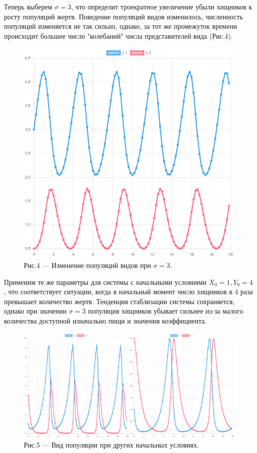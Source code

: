 \documentclass[a4paper,12pt]{article}
\begin{document}
Теперь выберем $\sigma = 3$, что определит троекратное увеличение убыли хищников
к росту популяций жертв. Поведение популяций видов изменилось, численность популяций изменяется не так сильно,
однако, за тот же промежуток времени происходит большее число "колебаний" числа представителей вида (Рис.4).
\begin{figure}[h]
    \centering
    \includegraphics[width=0.5\linewidth]{pictures/task2.png}
    \captionsetup{labelformat=empty}
    \caption{Рис.4 --- Изменение популяций видов при $\sigma = 3$.}
\end{figure}

Применим те же параметры для системы с начальными условиями $X_0 = 1, Y_0 = 4$, что соответствует 
ситуации, когда в начальный момент число хищников в 4 раза превышает количество жертв.
Тенденция стаблизации системы сохраняется, однако при значении $\sigma = 3$ популяция 
хищников убывает сильнее из-за малого количества доступной изначально пищи и значения коэффициента.
\begin{figure}[h]
    \centering
    \includegraphics[width=0.8\linewidth]{pictures/task3.png}
    \captionsetup{labelformat=empty}
    \caption{Рис.5 --- Вид популяции при других начальных условиях.}
\end{figure}
\newpage
\end{document}
